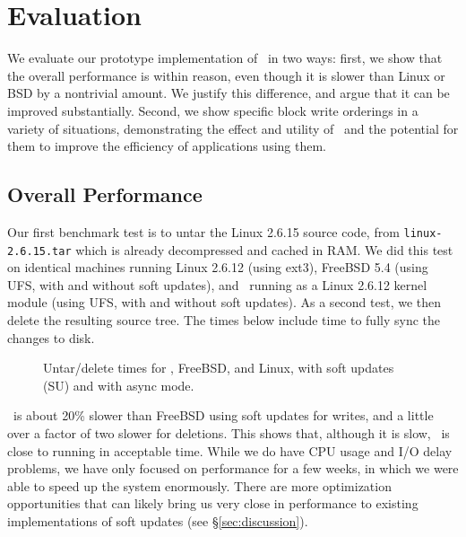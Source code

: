 \section {Evaluation}
\label{sec:evaluation}

We evaluate our prototype implementation of \Kudos\ in two ways: first, we
show that the overall performance is within reason, even though it is slower
than Linux or BSD by a nontrivial amount. We justify this difference, and argue
that it can be improved substantially. Second, we show specific block write
orderings in a variety of situations, demonstrating the effect and utility of
\opgroups\ and the potential for them to improve the efficiency of applications
using them.

\subsection {Overall Performance}

Our first benchmark test is to untar the Linux 2.6.15 source code, from
\texttt{linux-2.6.15.tar} which is already decompressed and cached in RAM. We
did this test on identical machines running Linux 2.6.12 (using ext3), FreeBSD
5.4 (using UFS, with and without soft updates), and \Kudos\ running as a Linux
2.6.12 kernel module (using UFS, with and without soft updates). As a second
test, we then delete the resulting source tree. The times below include time to
fully sync the changes to disk.

\begin{figure}[htb]
\caption{\label{fig:macro} Untar/delete times for \Kudos, FreeBSD, and Linux,
with soft updates (SU) and with async mode.}
\end{figure}

\Kudos\ is about 20\% slower than FreeBSD using soft updates for
writes, and a little over a factor of two slower for deletions. This
shows that, although it is slow, \Kudos\ is close to running in
acceptable time. While we do have CPU usage and I/O delay problems, we
have only focused on performance for a few weeks, in which we were
able to speed up the system enormously.  There are more optimization
opportunities that can likely bring us very close in performance to
existing implementations of soft updates (see \S\ref{sec:discussion}).

